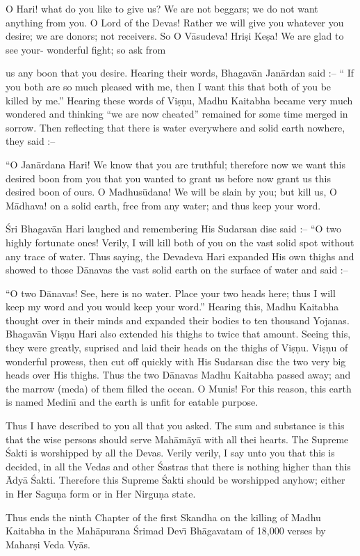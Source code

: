 O Hari! what do you like to give us? We are not beggars; we do not want anything from you. O Lord of the Devas! Rather we will give you whatever you desire; we are donors; not receivers. So O V\=asudeva! Hri\d{s}i Ke\d{s}a! We are glad to see your- wonderful fight; so ask from

us any boon that you desire. Hearing their words, Bhagav\=an Jan\=ardan said :-- `` If you both are so much pleased with me, then I want this that both of you be killed by me.'' Hearing these words of Vi\d{s}\d{n}u, Madhu Kaitabha became very much wondered and thinking ``we are now cheated'' remained for some time merged in sorrow. Then reflecting that there is water everywhere and solid earth nowhere, they said :--

``O Jan\=ardana Hari! We know that you are truthful; therefore now we want this desired boon from you that you wanted to grant us before now grant us this desired boon of ours. O Madhus\=udana! We will be slain by you; but kill us, O M\=adhava! on a solid earth, free from any water; and thus keep your word.

\'Sri Bhagav\=an Hari laughed and remembering His Sudarsan disc said :-- ``O two highly fortunate ones! Verily, I will kill both of you on the vast solid spot without any trace of water. Thus saying, the Devadeva Hari expanded His own thighs and showed to those D\=anavas the vast solid earth on the surface of water and said :--

``O two D\=anavas! See, here is no water. Place your two heads here; thus I will keep my word and you would keep your word.'' Hearing this, Madhu Kaitabha thought over in their minds and expanded their bodies to ten thousand Yojanas. Bhagav\=an Vi\d{s}\d{n}u Hari also extended his thighs to twice that amount. Seeing this, they were greatly, suprised and laid their heads on the thighs of Vi\d{s}\d{n}u. Vi\d{s}\d{n}u of wonderful prowess, then cut off quickly with His Sudarsan disc the two very big heads over His thighs. Thus the two D\=anavas Madhu Kaitabha passed away; and the marrow (meda) of them filled the ocean. O Munis! For this reason, this earth is named Medin\={\i} and the earth is unfit for eatable purpose.

Thus I have described to you all that you asked. The sum and substance is this that the wise persons should serve Mah\=am\=ay\=a with all thei hearts. The Supreme \'Sakti is worshipped by all the Devas. Verily verily, I say unto you that this is decided, in all the Vedas and other \'Sastras that there is nothing higher than this \=Ady\=a \'Sakti. Therefore this Supreme \'Sakti should be worshipped anyhow; either in Her Sagu\d{n}a form or in Her Nirgu\d{n}a state.

Thus ends the ninth Chapter of the first Skandha on the killing of Madhu Kaitabha in the Mah\=apurana \'Srimad Dev\={\i} Bh\=agavatam of 18,000 verses by Mahar\d{s}i Veda Vy\=as.



